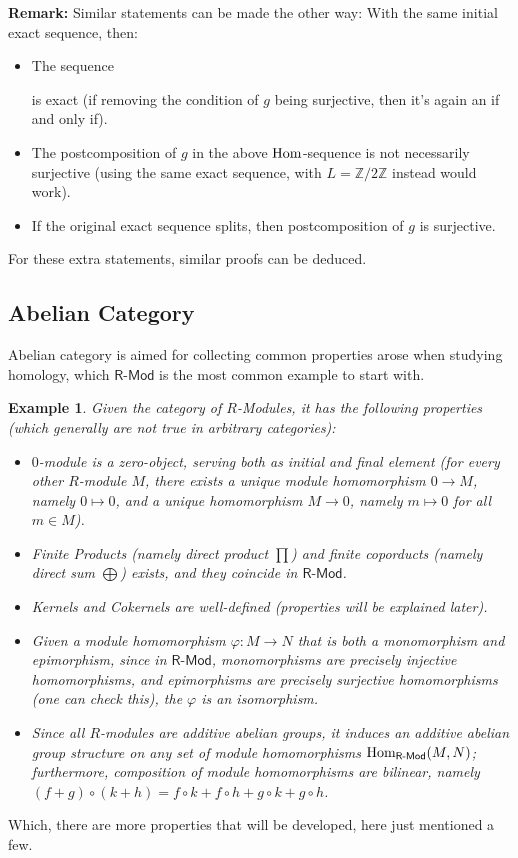 \documentclass[x11names,reqno,12pt]{extarticle}
\newtheorem{exm}{Example}
\newcommand{\Hom}{\textmd{Hom}}
\newcommand{\cat}[1]{\textsf{#1}}
\begin{document}
\textbf{Remark:} Similar statements can be made the other way: With the same initial exact sequence, then:
\begin{itemize}
    \item[(1)] The sequence  is exact (if removing the condition of $g$ being surjective, then it's again an if and only if).
    \item[(2)] The postcomposition of $g$ in the above $\Hom$-sequence is not necessarily surjective (using the same exact sequence, with $L=\mathbb{Z}/2\mathbb{Z}$ instead would work).
    \item[(3)] If the original exact sequence splits, then postcomposition of $g$ is surjective.
\end{itemize}
For these extra statements, similar proofs can be deduced.

\newpage
\subsection*{Abelian Category}
Abelian category is aimed for collecting common properties arose when studying homology, which $\cat{R-Mod}$ is the most common example to start with.
\begin{exm}
    Given the category of $R$-Modules, it has the following properties (which generally are not true in arbitrary categories):
    \begin{itemize}
        \item[1.] $0$-module is a zero-object, serving both as initial and final element (for every other $R$-module $M$, there exists a unique module homomorphism $0\rightarrow M$, namely $0\mapsto 0$, and a unique homomorphism $M\rightarrow 0$, namely $m\mapsto 0$ for all $m\in M$).
        \item[2.] Finite Products (namely direct product $\prod$) and finite coporducts (namely direct sum $\bigoplus$) exists, and they coincide in $\cat{R-Mod}$.
        \item[3.] Kernels and Cokernels are well-defined (properties will be explained later).
        \item[4.] Given a module homomorphism $\varphi:M\rightarrow N$ that is both a monomorphism and epimorphism, since in $\cat{R-Mod}$, monomorphisms are precisely injective homomorphisms, and epimorphisms are precisely surjective homomorphisms (one can check this), the $\varphi$ is an isomorphism.
        \item[5.] Since all $R$-modules are additive abelian groups, it induces an additive abelian group structure on any set of module homomorphisms $\Hom_\cat{R-Mod}(M,N)$; furthermore, composition of module homomorphisms are bilinear, namely $(f+g)\circ (k+h)=f\circ k+f\circ h+g\circ k+g\circ h$.
    \end{itemize}
\end{exm}
Which, there are more properties that will be developed, here just mentioned a few. 
\end{document}
